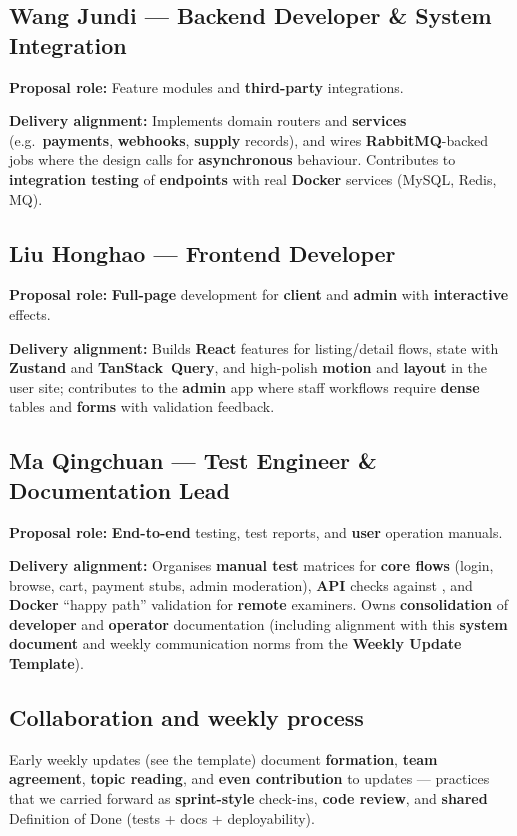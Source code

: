 \documentclass[11pt,a4paper]{article}
\begin{document}
\subsection{Wang Jundi --- Backend Developer \& System Integration}
\textbf{Proposal role:} Feature modules and \textbf{third-party} integrations.

\textbf{Delivery alignment:} Implements domain routers and \textbf{services} (e.g.\ \textbf{payments}, \textbf{webhooks}, \textbf{supply} records), and wires \textbf{RabbitMQ}-backed jobs where the design calls for \textbf{asynchronous} behaviour. Contributes to \textbf{integration testing} of \textbf{endpoints} with real \textbf{Docker} services (MySQL, Redis, MQ).

\subsection{Liu Honghao --- Frontend Developer}
\textbf{Proposal role:} \textbf{Full-page} development for \textbf{client} and \textbf{admin} with \textbf{interactive} effects.

\textbf{Delivery alignment:} Builds \textbf{React} features for listing/detail flows, state with \textbf{Zustand} and \textbf{TanStack~Query}, and high-polish \textbf{motion} and \textbf{layout} in the user site; contributes to the \textbf{admin} app where staff workflows require \textbf{dense} tables and \textbf{forms} with validation feedback.

\subsection{Ma Qingchuan --- Test Engineer \& Documentation Lead}
\textbf{Proposal role:} \textbf{End-to-end} testing, test reports, and \textbf{user} operation manuals.

\textbf{Delivery alignment:} Organises \textbf{manual test} matrices for \textbf{core flows} (login, browse, cart, payment stubs, admin moderation), \textbf{API} checks against , and \textbf{Docker} ``happy path'' validation for \textbf{remote} examiners. Owns \textbf{consolidation} of \textbf{developer} and \textbf{operator} documentation (including alignment with this \textbf{system document} and weekly communication norms from the \textbf{Weekly Update Template}).

\subsection{Collaboration and weekly process}
Early weekly updates (see the template) document \textbf{formation}, \textbf{team agreement}, \textbf{topic reading}, and \textbf{even contribution} to updates --- practices that we carried forward as \textbf{sprint-style} check-ins, \textbf{code review}, and \textbf{shared} Definition of Done (tests + docs + deployability).
\end{document}
